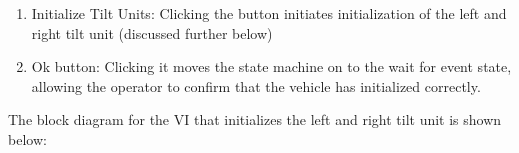 \begin{enumerate}
\item Initialize Tilt Units: Clicking the button initiates initialization of the left and right tilt unit (discussed further below)
\item Ok button: Clicking it moves the state machine on to the wait for event state, allowing the operator to confirm that the vehicle has initialized correctly.
\end{enumerate}

\noindent The block diagram for the VI that initializes the left and right tilt unit is shown below:

 

